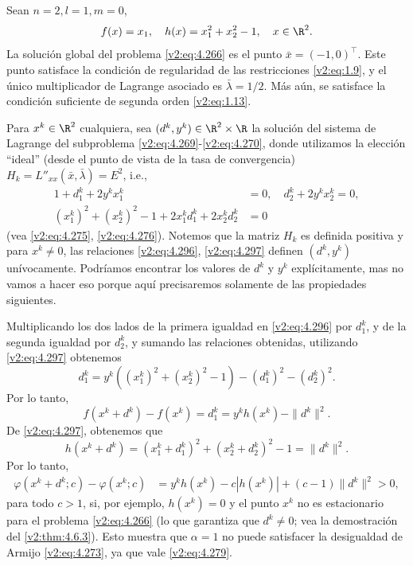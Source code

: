 \begin{example}\label{v2:exa:4.6.1}
Sean $n = 2, l = 1, m = 0$,
\[
f(x) = x_1, \quad h(x) = x_1^2 + x_2^2 - 1, \quad x \in \R^2.
\]
La solución global del problema \eqref{v2:eq:4.266} es el punto $\bar{x} = (-1, 0)^\top$. Este punto satisface la condición de regularidad de las restricciones \eqref{v2:eq:1.9}, y el único multiplicador de Lagrange asociado es $\bar{\lambda} = 1/2$. Más aún, se satisface la condición suficiente de segunda orden \eqref{v2:eq:1.13}.

Para $x^k \in \R^2$ cualquiera, sea $(d^k, y^k) \in \R^2 \times \R$ la solución del sistema de Lagrange del subproblema \eqref{v2:eq:4.269}-\eqref{v2:eq:4.270}, donde utilizamos la elección ``ideal'' (desde el punto de vista de la tasa de convergencia) $H_k = L''_{xx}(\bar{x}, \bar{\lambda}) = E^2$, i.e.,
\begin{align}
1 + d_1^k + 2y^k x_1^k &= 0, \quad d_2^k + 2y^k x_2^k = 0, \label{v2:eq:4.296} \\
(x_1^k)^2 + (x_2^k)^2 - 1 + 2x_1^k d_1^k + 2x_2^k d_2^k &= 0 \label{v2:eq:4.297}
\end{align}
(vea \eqref{v2:eq:4.275}, \eqref{v2:eq:4.276}). Notemos que la matriz $H_k$ es definida positiva y para $x^k \neq 0$, las relaciones \eqref{v2:eq:4.296}, \eqref{v2:eq:4.297} definen $(d^k, y^k)$ unívocamente. Podríamos encontrar los valores de $d^k$ y $y^k$ explícitamente, mas no vamos a hacer eso porque aquí precisaremos solamente de las propiedades siguientes.

Multiplicando los dos lados de la primera igualdad en \eqref{v2:eq:4.296} por $d_1^k$, y de la segunda igualdad por $d_2^k$, y sumando las relaciones obtenidas, utilizando \eqref{v2:eq:4.297} obtenemos
\[
d_1^k = y^k ((x_1^k)^2 + (x_2^k)^2 - 1) - (d_1^k)^2 - (d_2^k)^2.
\]
Por lo tanto,
\[
f(x^k + d^k) - f(x^k) = d_1^k = y^k h(x^k) - \|d^k\|^2.
\]
De \eqref{v2:eq:4.297}, obtenemos que
\[
h(x^k + d^k) = (x_1^k + d_1^k)^2 + (x_2^k + d_2^k)^2 - 1 = \|d^k\|^2.
\]
Por lo tanto,
\begin{align*}
\varphi(x^k + d^k; c) - \varphi(x^k; c) &= y^k h(x^k) - c|h(x^k)| + (c - 1)\|d^k\|^2 > 0,
\end{align*}
para todo $c > 1$, si, por ejemplo, $h(x^k) = 0$ y el punto $x^k$ no es estacionario para el problema \eqref{v2:eq:4.266} (lo que garantiza que $d^k \neq 0$; vea la demostración del \cref{v2:thm:4.6.3}). Esto muestra que $\alpha = 1$ no puede satisfacer la desigualdad de Armijo \eqref{v2:eq:4.273}, ya que vale \eqref{v2:eq:4.279}.
\end{example}

